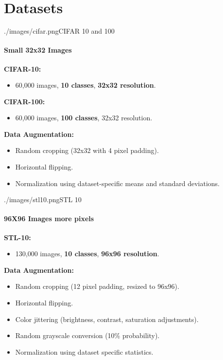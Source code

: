 \section{Datasets}

\begin{sidepic}{./images/cifar.png}{CIFAR 10 and 100}
  \framesubtitle{Small 32x32 Images}
  \textbf{CIFAR-10:}
  \begin{itemize}
    \item 60,000 images, \textbf{10 classes}, \textbf{32x32 resolution}.
  \end{itemize}

  \textbf{CIFAR-100:}
  \begin{itemize}
    \item 60,000 images, \textbf{100 classes}, 32x32 resolution.
  \end{itemize}

  \textbf{Data Augmentation:}
  \begin{itemize}
    \item Random cropping (32x32 with 4 pixel padding).
    \item Horizontal flipping.
    \item Normalization using dataset-specific means and standard deviations.
  \end{itemize}
\end{sidepic}

\begin{sidepic}{./images/stl10.png}{STL 10}
  \framesubtitle{96X96 Images more pixels}
  \textbf{STL-10:}
  \begin{itemize}
    \item 130,000 images, \textbf{10 classes}, \textbf{96x96 resolution}.
  \end{itemize}

  \textbf{Data Augmentation:}
  \begin{itemize}
    \item Random cropping (12 pixel padding, resized to 96x96).
    \item Horizontal flipping.
    \item Color jittering (brightness, contrast, saturation adjustments).
    \item Random grayscale conversion (10\% probability).
    \item Normalization using dataset specific statistics.
  \end{itemize}
\end{sidepic}
